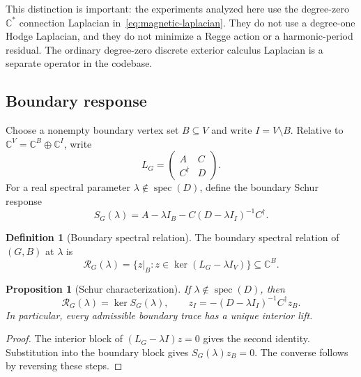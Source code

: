 \documentclass[11pt]{article}
\numberwithin{equation}{section}
\newtheorem{proposition}[theorem]{Proposition}
\theoremstyle{definition}
\newtheorem{definition}[theorem]{Definition}
\theoremstyle{remark}
\newcommand{\C}{\mathbb{C}}
\newcommand{\spec}{\operatorname{spec}}
\begin{document}
This distinction is important: the experiments analyzed here use the
degree-zero $\C^*$ connection Laplacian in~\eqref{eq:magnetic-laplacian}.  They
do not use a degree-one Hodge Laplacian, and they do not minimize a Regge action
or a harmonic-period residual.  The ordinary degree-zero discrete exterior
calculus Laplacian is a separate operator in the codebase.

\subsection{Boundary response}

Choose a nonempty boundary vertex set $B\subseteq V$ and write
$I=V\setminus B$.  Relative to $\C^V=\C^B\oplus\C^I$, write
\begin{equation}
  L_G=\begin{pmatrix}A&C\\ C^\dagger&D\end{pmatrix}.
  \label{eq:block-laplacian}
\end{equation}
For a real spectral parameter $\lambda\notin\spec(D)$, define the boundary
Schur response
\begin{equation}
  S_G(\lambda)
  =A-\lambda I_B-C(D-\lambda I_I)^{-1}C^\dagger.
  \label{eq:schur}
\end{equation}

\begin{definition}[Boundary spectral relation]
The boundary spectral relation of $(G,B)$ at $\lambda$ is
\begin{equation}
  \mathcal R_G(\lambda)
  =\{z|_B:z\in\ker(L_G-\lambda I_V)\}\subseteq\C^B.
  \label{eq:relation}
\end{equation}
\end{definition}

\begin{proposition}[Schur characterization]
\label{prop:schur}
If $\lambda\notin\spec(D)$, then
\begin{equation}
  \mathcal R_G(\lambda)=\ker S_G(\lambda),
  \qquad
  z_I=-(D-\lambda I_I)^{-1}C^\dagger z_B.
  \label{eq:schur-kernel}
\end{equation}
In particular, every admissible boundary trace has a unique interior lift.
\end{proposition}

\begin{proof}
The interior block of $(L_G-\lambda I)z=0$ gives the second identity.
Substitution into the boundary block gives
$S_G(\lambda)z_B=0$.  The converse follows by reversing these steps.
\end{proof}
\end{document}
